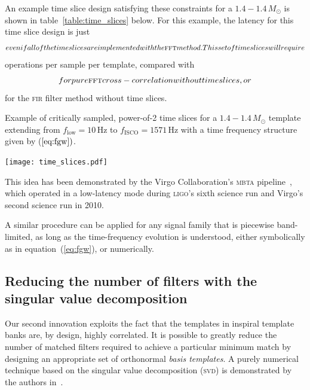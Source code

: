  An example time slice design satisfying these constraints for a $1.4 - 1.4 \, M_{\odot}$ is shown in table~\ref{table:time_slices} below.  For this example, the latency for this time slice design is just $$ even if all of the time slices are implemented with the \textsc{fft} method.  This set of time slices will require $$ operations per sample per template, compared with $$ for pure \textsc{fft} cross-correlation without time slices, or $$ for the \textsc{fir} filter method without time slices.

\begin{table}[!h]
\caption{Example of critically sampled, power-of-2 time slices for a $1.4 - 1.4 \, M_{\odot}$ template extending from $f_\mathrm{low} = 10 \, \mathrm{Hz}$ to $f_\mathrm{ISCO} = 1571\, \mathrm{Hz}$ with a time frequency structure given by ($\ref{eq:fgw})$.}
\label{table:time_slices}
\begin{minipage}[c]{0.5\textwidth}
\centering
\texttt{[image: time\_slices.pdf]}
\end{minipage}
\begin{minipage}[c]{0.3\textwidth}
\centering

\end{minipage}
\end{table}

  This idea has been demonstrated by the Virgo Collaboration's \textsc{mbta} pipeline~\cite{Marion2004,beauville2006,beauville2008,Buskulic2010}, which operated in a low-latency mode during \textsc{ligo}'s sixth science run and Virgo's second science run in 2010.

A similar procedure can be applied for any signal family that is piecewise band-limited, as long as the time-frequency evolution is understood, either symbolically as in equation~(\ref{eq:fgw}), or numerically.

\subsection{Reducing the number of filters with the singular value decomposition}

Our second innovation exploits the fact that the templates in inspiral template banks are, by design, highly correlated.  It is possible to greatly reduce the number of matched filters required to achieve a particular minimum match by designing an appropriate set of orthonormal {\em basis templates}.  A purely numerical technique based on the singular value decomposition (\textsc{svd}) is demonstrated by the authors in~\cite{Cannon:2010p10398}.

